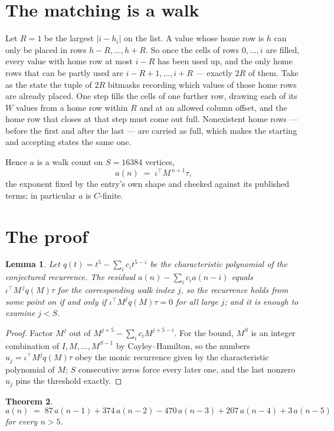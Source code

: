 \documentclass[11pt,a4paper]{article}
\theoremstyle{plain}
\newtheorem{theorem}{Theorem}
\newtheorem{lemma}[theorem]{Lemma}
\theoremstyle{definition}
\begin{document}
\section{The matching is a walk}

Let $R=1$ be the largest $|i-h_i|$ on the list. A value whose home row is $h$ can only be
placed in rows $h-R,\dots,h+R$. So once the cells of rows $0,\dots,i$ are filled, every
value with home row at most $i-R$ has been used up, and the only home rows that can be
partly used are $i-R+1,\dots,i+R$ --- exactly $2R$ of them. Take as the state the tuple of
$2R$ bitmasks recording which values of those home rows are already placed. One step fills
the cells of one further row, drawing each of its $W$ values from a home row within $R$
and at an allowed column offset, and the home row that closes at that step must come out
full. Nonexistent home rows --- before the first and after the last --- are carried as
full, which makes the starting and accepting states the same one.

Hence $a$ is a walk count on $S=16384$ vertices,
\[
a(n)\;=\;\iota^{\!\top}M^{\,n+1}\tau ,
\]
the exponent fixed by the entry's own shape and checked against its published terms; in
particular $a$ is $C$-finite.

\section{The proof}

\begin{lemma}\label{lem:crit}
Let $q(t)=t^{5}-\sum_i c_it^{5-i}$ be the characteristic polynomial of the
conjectured recurrence. The residual $a(n)-\sum_ic_ia(n-i)$ equals
$\iota^{\!\top}M^{\,j}q(M)\tau$ for the corresponding walk index $j$, so the recurrence
holds from some point on if and only if $\iota^{\!\top}M^{j}q(M)\tau=0$ for all large $j$;
and it is enough to examine $j<S$.
\end{lemma}

\begin{proof}
Factor $M^{j}$ out of $M^{j+5}-\sum_ic_iM^{j+5-i}$. For the bound, $M^{S}$
is an integer combination of $I,M,\dots,M^{S-1}$ by Cayley--Hamilton, so the numbers
$u_j=\iota^{\!\top}M^{j}q(M)\tau$ obey the monic recurrence given by the characteristic
polynomial of $M$; $S$ consecutive zeros force every later one, and the last nonzero $u_j$
pins the threshold exactly.
\end{proof}

\begin{theorem}
\[
a(n)\;=\;87\,a(n-1) + 374\,a(n-2) - 470\,a(n-3) + 207\,a(n-4) + 3\,a(n-5)
\]
for every $n>5$.
\end{theorem}
\end{document}
